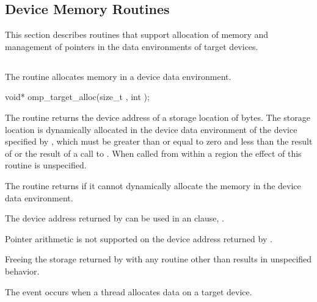 \pagebreak
\begin{ccppspecific}
\vspace{-3\baselineskip}
\section{Device Memory Routines}
\label{sec:Device Memory Routines}
This section describes routines that support allocation of memory and 
management of pointers in the data environments of target devices.


\subsection{}
\label{subsec:omp_target_alloc}
\summary
The  routine allocates memory in a device data
environment.

\format
\begin{boxedcode}
void* omp\_target\_alloc(size\_t , int );
\end{boxedcode}

\effect

The  routine returns the device address of a storage
location of  bytes. The storage location is dynamically allocated in
the device data environment of the device specified by , which
must be greater than or equal to zero and less than the result of
 or the result of a call to
. When called from within a  region 
the effect of this routine is unspecified.

The  routine returns  if it cannot dynamically
allocate the memory in the device data environment. 

The device address returned by  can be used in an 
 clause, .

Pointer arithmetic is not supported on the device address returned by
.

Freeing the storage returned by  with any routine
other than  results in unspecified behavior.

\pagebreak
{}
\events
The  event occurs when a thread allocates data on a target device.


\end{ccppspecific}
